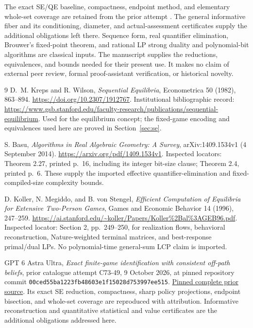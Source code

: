 \documentclass[11pt,a4paper]{article}
\numberwithin{equation}{section}
\theoremstyle{definition}
\begin{document}
The exact SE/QE baseline, compactness, endpoint method, and elementary
whole-set coverage are retained from the prior attempt \cite{Prior}.
The general informative fiber and its conditioning, diameter, and
actual-assessment certificates supply the additional obligations
left there. Sequence form, real quantifier elimination, Brouwer's
fixed-point theorem, and rational LP strong duality and polynomial-bit
algorithms are classical inputs. The manuscript supplies the
reductions, equivalences, and bounds needed for their present use.
It makes no claim of external peer review, formal proof-assistant
verification, or historical novelty.

\begin{thebibliography}{9}
D.~M. Kreps and R. Wilson,
\emph{Sequential Equilibria},
Econometrica 50 (1982), 863--894.
\url{https://doi.org/10.2307/1912767}.
Institutional bibliographic record:
\url{https://www.gsb.stanford.edu/faculty-research/publications/sequential-equilibrium}.
Used for the equilibrium concept; the fixed-game encoding and
equivalences used here are proved in Section~\ref{sec:se}.

S. Basu, \emph{Algorithms in Real Algebraic Geometry: A Survey},
arXiv:1409.1534v1 (4 September 2014).
\url{https://arxiv.org/pdf/1409.1534v1}.
Inspected locators: Theorem 2.27, printed p.~16, including its
integer bit-size clause; Theorem 2.4, printed p.~6.
These supply the imported effective quantifier-elimination and
fixed-compiled-size complexity bounds.

D. Koller, N. Megiddo, and B. von Stengel,
\emph{Efficient Computation of Equilibria for Extensive Two-Person Games},
Games and Economic Behavior 14 (1996), 247--259.
\url{https://ai.stanford.edu/~koller/Papers/Koller%2Bal%3AGEB96.pdf}.
Inspected locator: Section 2, pp.~249--250, for realization flows,
behavioral reconstruction, Nature-weighted terminal matrices, and
best-response primal/dual LPs. No polynomial-time general-sum LCP
claim is imported.

GPT 6 Astra Ultra,
\emph{Exact finite-game identification with consistent off-path beliefs},
prior catalogue attempt C73-49, 9 October 2026,
at pinned repository commit
\texttt{00ced55ba1223fb48603e1f15028d753997ee515}.
\href{https://github.com/mehmetmars7/Erdosproblems-llm-hunter/blob/00ced55ba1223fb48603e1f15028d753997ee515/attacks/open_problems/economics/gpt6_astra_ultra/C73-49.tex}
{Pinned complete prior source}.
Its exact SE reduction, compactness, sharp policy projections,
endpoint bisection, and whole-set coverage are reproduced with
attribution. Informative reconstruction and quantitative statistical
and value certificates are the additional obligations addressed here.
\end{thebibliography}
\end{document}
